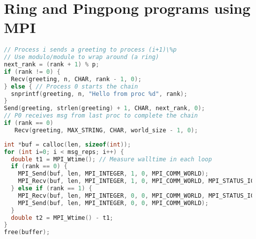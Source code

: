 \section*{Ring and Pingpong programs using MPI}
\begin{lstlisting}[language=C,xrightmargin=2pt]
// Process i sends a greeting to process (i+1)\%p
// Use modulo/module to wrap around (a ring)
next_rank = (rank + 1) % p;
if (rank != 0) {
  Recv(greeting, n, CHAR, rank - 1, 0);
} else { // Process 0 starts the chain
  snprintf(greeting, n, "Hello from proc %d", rank);
}
Send(greeting, strlen(greeting) + 1, CHAR, next_rank, 0);
// P0 receives msg from last proc to complete the chain
if (rank == 0)
   Recv(greeting, MAX_STRING, CHAR, world_size - 1, 0);
\end{lstlisting}
\begin{lstlisting}[language=C,xrightmargin=2pt]
int *buf = calloc(len, sizeof(int));
for (int i=0; i < msg_reps; i++) {
  double t1 = MPI_Wtime(); // Measure walltime in each loop
  if (rank == 0) {
    MPI_Send(buf, len, MPI_INTEGER, 1, 0, MPI_COMM_WORLD);
    MPI_Recv(buf, len, MPI_INTEGER, 1, 0, MPI_COMM_WORLD, MPI_STATUS_IGNORE);
  } else if (rank == 1) {
    MPI_Recv(buf, len, MPI_INTEGER, 0, 0, MPI_COMM_WORLD, MPI_STATUS_IGNORE);
    MPI_Send(buf, len, MPI_INTEGER, 0, 0, MPI_COMM_WORLD);
  }
  double t2 = MPI_Wtime() - t1;
}
free(buffer);
\end{lstlisting}
